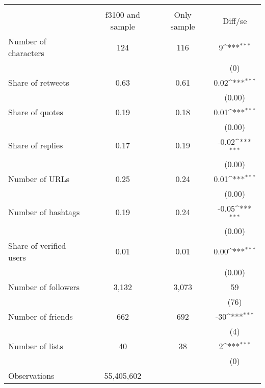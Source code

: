 {
\def\sym#1{\ifmmode^{#1}\else\(^{#1}\)\fi}
\begin{tabular}{l*{1}{ccc}}
\hline\hline
                    &\multicolumn{3}{c}{}                           \\
                    &f3100 and sample& Only sample&     Diff/se         \\
\hline
Number of characters&         124&         116&           9\sym{***}\\
                    &            &            &         (0)         \\
Share of retweets   &        0.63&        0.61&        0.02\sym{***}\\
                    &            &            &      (0.00)         \\
Share of quotes     &        0.19&        0.18&        0.01\sym{***}\\
                    &            &            &      (0.00)         \\
Share of replies    &        0.17&        0.19&       -0.02\sym{***}\\
                    &            &            &      (0.00)         \\
Number of URLs      &        0.25&        0.24&        0.01\sym{***}\\
                    &            &            &      (0.00)         \\
Number of hashtags  &        0.19&        0.24&       -0.05\sym{***}\\
                    &            &            &      (0.00)         \\
Share of verified users&        0.01&        0.01&        0.00\sym{***}\\
                    &            &            &      (0.00)         \\
Number of followers &       3,132&       3,073&          59         \\
                    &            &            &        (76)         \\
Number of friends   &         662&         692&         -30\sym{***}\\
                    &            &            &         (4)         \\
Number of lists     &          40&          38&           2\sym{***}\\
                    &            &            &         (0)         \\
\hline
Observations        &  55,405,602&            &                     \\
\hline\hline
\end{tabular}
}
